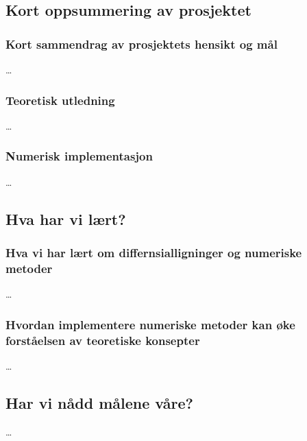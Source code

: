 \subsection{Kort oppsummering av prosjektet}
\subsubsection{Kort sammendrag av prosjektets hensikt og mål}
\dots

\subsubsection{Teoretisk utledning}
\dots

\subsubsection{Numerisk implementasjon}
\dots





\subsection{Hva har vi lært?}
\subsubsection{Hva vi har lært om differnsialligninger og numeriske metoder}
\dots

\subsubsection{Hvordan implementere numeriske metoder kan øke forståelsen av teoretiske konsepter}
\dots

\subsection{Har vi nådd målene våre?}
\dots


